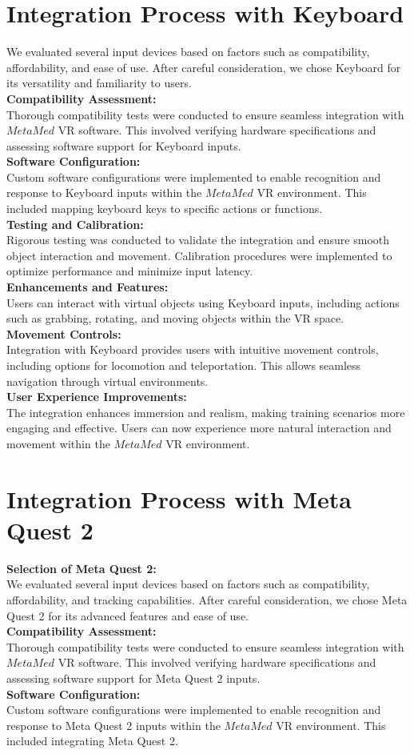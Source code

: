 \section{Integration Process with Keyboard}
We evaluated several input devices based on factors such as compatibility, affordability, and ease of use. After careful consideration, we chose Keyboard for its versatility and familiarity to users.\\
\textbf{Compatibility Assessment:}\\
Thorough compatibility tests were conducted to ensure seamless integration with $MetaMed$ VR software. This involved verifying hardware specifications and assessing software support for Keyboard inputs.\\
\textbf{Software Configuration:}\\
Custom software configurations were implemented to enable recognition and response to Keyboard inputs within the $MetaMed$ VR environment. This included mapping keyboard keys to specific actions or functions.\\
\textbf{Testing and Calibration:}\\
Rigorous testing was conducted to validate the integration and ensure smooth object interaction and movement. Calibration procedures were implemented to optimize performance and minimize input latency.\\
\textbf{Enhancements and Features:}\\ 
Users can interact with virtual objects using Keyboard inputs, including actions such as grabbing, rotating, and moving objects within the VR space.\\
\textbf{Movement Controls:}\\
Integration with Keyboard provides users with intuitive movement controls, including options for locomotion and teleportation. This allows seamless navigation through virtual environments.\\
\textbf{User Experience Improvements:}\\
The integration enhances immersion and realism, making training scenarios more engaging and effective. Users can now experience more natural interaction and movement within the $MetaMed$ VR environment.
\section{Integration Process with Meta Quest 2}
\textbf{Selection of Meta Quest 2:}\\
We evaluated several input devices based on factors such as compatibility, affordability, and tracking capabilities. After careful consideration, we chose Meta Quest 2 for its advanced features and ease of use.\\
\textbf{Compatibility Assessment:}\\
Thorough compatibility tests were conducted to ensure seamless integration with $MetaMed$ VR software. This involved verifying hardware specifications and assessing software support for Meta Quest 2 inputs.\\
\textbf{Software Configuration:}\\
Custom software configurations were implemented to enable recognition and response to Meta Quest 2 inputs within the $MetaMed$ VR environment. This included integrating Meta Quest 2.
